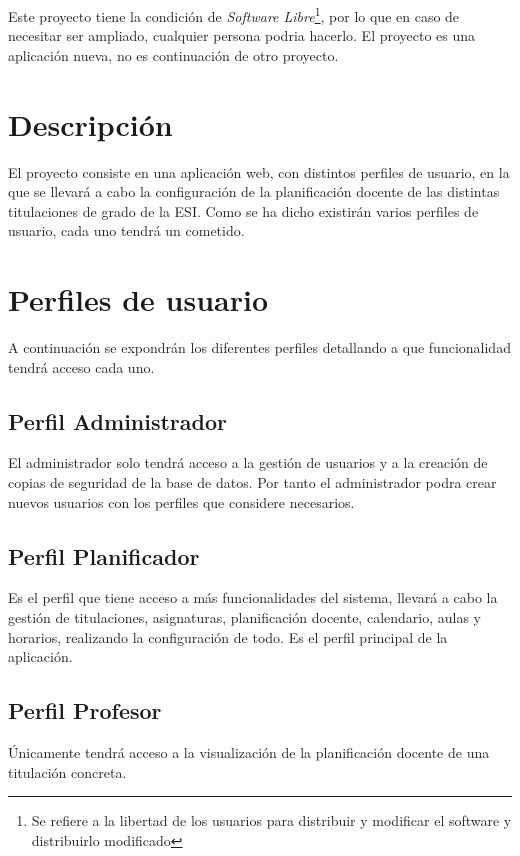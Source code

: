 Este proyecto tiene la condición de {\em Software Libre}\footnote{Se refiere a la libertad de los usuarios para distribuir y modificar el software y distribuirlo modificado}, por lo que en caso de necesitar ser ampliado, cualquier persona podria hacerlo. El proyecto es una aplicación nueva, no es continuación de otro proyecto.

\section{Descripción}

El proyecto consiste en una aplicación web, con distintos perfiles de usuario, en la que se llevará a cabo la configuración de la planificación docente de las distintas titulaciones de grado de la ESI. Como se ha dicho existirán varios perfiles de usuario, cada uno tendrá un cometido.

\section{Perfiles de usuario}

A continuación se expondrán los diferentes perfiles detallando a que funcionalidad tendrá acceso cada uno.

\subsection{Perfil Administrador}

El administrador solo tendrá acceso a la gestión de usuarios y a la creación de copias de seguridad de la base de datos. Por tanto el administrador podra crear nuevos usuarios con los perfiles que considere necesarios.

\subsection{Perfil Planificador}
Es el perfil que tiene acceso a más funcionalidades del sistema, llevará a cabo la gestión de titulaciones, asignaturas, planificación docente, calendario, aulas y horarios, realizando la configuración de todo. Es el perfil principal de la aplicación.

\subsection{Perfil Profesor}
Únicamente tendrá acceso a la visualización de la planificación docente de una titulación concreta.

